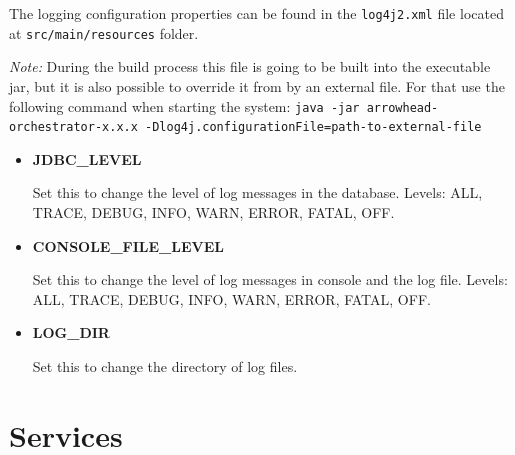 \documentclass[a4paper]{arrowhead}
\begin{document}
The logging configuration properties can be found in the \texttt{log4j2.xml} file located at \texttt{src/main/resources} folder.

\textit{Note:} During the build process this file is going to be built into the executable jar, but it is also possible to override it from by an external file. For that use the following command when starting the system: \texttt{java -jar arrowhead-orchestrator-x.x.x -Dlog4j.configurationFile={path-to-external-file}}

\begin{itemize}
    \item \textbf{JDBC\_LEVEL}
    
    Set this to change the level of log messages in the database. Levels: ALL, TRACE, DEBUG, INFO, WARN, ERROR, FATAL, OFF.
    
    \item \textbf{CONSOLE\_FILE\_LEVEL}
    
    Set this to change the level of log messages in console and the log file. Levels: ALL, TRACE, DEBUG, INFO, WARN, ERROR, FATAL, OFF.
    
    \item \textbf{LOG\_DIR}
    
    Set this to change the directory of log files.
\end{itemize}
  
\newpage

\section{Services}
\label{sec:services}
\end{document}
